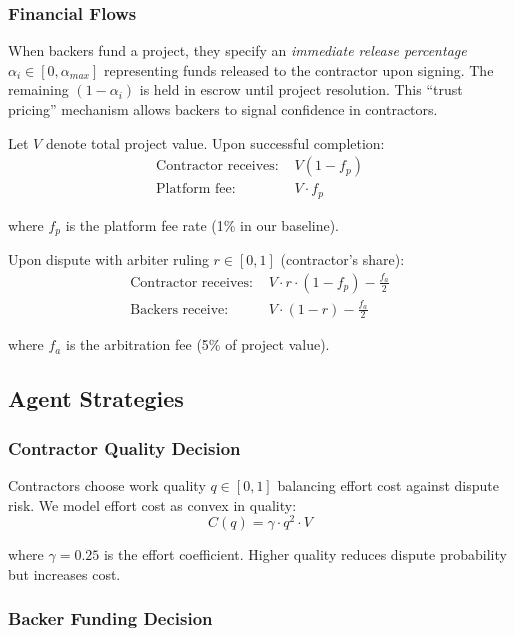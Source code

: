 \documentclass[11pt,a4paper]{article}
\begin{document}
\subsubsection{Financial Flows}

When backers fund a project, they specify an \textit{immediate release percentage} $\alpha_i \in [0, \alpha_{max}]$ representing funds released to the contractor upon signing. The remaining $(1-\alpha_i)$ is held in escrow until project resolution. This ``trust pricing'' mechanism allows backers to signal confidence in contractors.

Let $V$ denote total project value. Upon successful completion:
\begin{align}
    \text{Contractor receives: } & V(1 - f_p) \\
    \text{Platform fee: } & V \cdot f_p
\end{align}

where $f_p$ is the platform fee rate (1\% in our baseline).

Upon dispute with arbiter ruling $r \in [0,1]$ (contractor's share):
\begin{align}
    \text{Contractor receives: } & V \cdot r \cdot (1 - f_p) - \frac{f_a}{2} \\
    \text{Backers receive: } & V \cdot (1-r) - \frac{f_a}{2}
\end{align}

where $f_a$ is the arbitration fee (5\% of project value).

\subsection{Agent Strategies}

\subsubsection{Contractor Quality Decision}

Contractors choose work quality $q \in [0,1]$ balancing effort cost against dispute risk. We model effort cost as convex in quality:
\begin{equation}
    C(q) = \gamma \cdot q^2 \cdot V
\end{equation}

where $\gamma = 0.25$ is the effort coefficient. Higher quality reduces dispute probability but increases cost.

\subsubsection{Backer Funding Decision}
\end{document}
